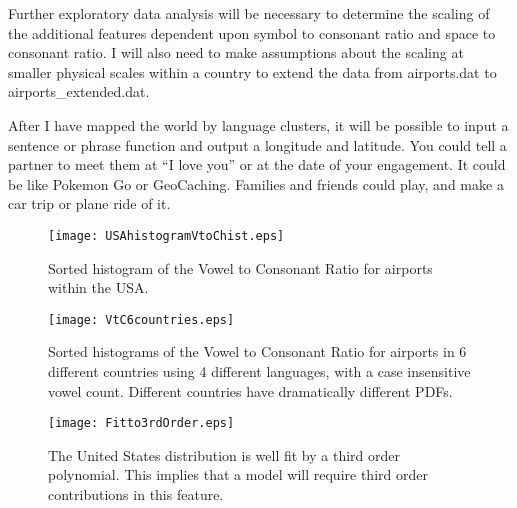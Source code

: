 \documentclass{article}
\begin{document}
Further exploratory data analysis will be necessary to determine the
scaling of the additional features dependent upon symbol to consonant
ratio and space to consonant ratio. I will also need to make
assumptions about the scaling at smaller physical scales within a
country to extend the data from airports.dat to airports\_extended.dat.

After I have mapped the world by language clusters, it will be
possible to input a sentence or phrase function and output a longitude
and latitude. You could tell a partner to meet them at ``I love you''
or at the date of your engagement.  It could be like Pokemon Go or
GeoCaching. Families and friends could play, and make a car trip or plane ride of it.

\begin{figure}
\texttt{[image: USAhistogramVtoChist.eps]}
\caption{Sorted histogram of the Vowel to Consonant Ratio for airports within the USA.}
\label{fig1}
\end{figure}

\begin{figure}
\texttt{[image: VtC6countries.eps]}
\caption{Sorted histograms of the Vowel to Consonant Ratio for airports in 6 different countries using 4 different languages, with a case insensitive vowel count. Different countries have dramatically different PDFs.}
\label{fig2}
\end{figure}

\begin{figure}
\texttt{[image: Fitto3rdOrder.eps]}
\caption{The United States distribution is well fit by a third order polynomial. This implies that a model will require third order contributions in this feature.}
\label{fig3}
\end{figure}
\end{document}
